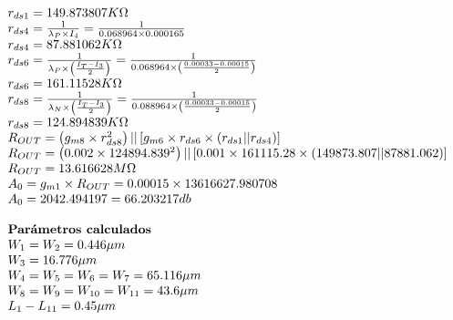 \begin{equation*}
\begin{array}{l l}
		r_{ds1} =  149.873807  K \Omega \\
		r_{ds4} = \frac{1}{\lambda_{P} \times I_{4}} = \frac{1}{ 0.068964  \times  0.000165 } \\
		r_{ds4} =  87.881062  K \Omega \\
		r_{ds6} = \frac{1}{\lambda_{P} \times \left( \frac{I_{T} - I_{3}}{2} \right)} = \frac{1}{ 0.068964  \times \left( \frac{ 0.00033  -  0.00015 }{2} \right)} \\
		r_{ds6} =  161.11528  K \Omega \\
		r_{ds8} = \frac{1}{\lambda_{N} \times \left( \frac{I_{T} - I_{3}}{2} \right)} = \frac{1}{ 0.088964  \times \left( \frac{ 0.00033  -  0.00015 }{2} \right)} \\
		r_{ds8} =  124.894839  K \Omega \\
		R_{OUT} = \left( g_{m8} \times r_{ds8}^{2} \right) || \left[ g_{m6} \times r_{ds6} \times \left( r_{ds1} || r_{ds4} \right) \right] \\
		R_{OUT} = \left(  0.002  \times  124894.839 ^{2} \right) || \left[  0.001  \times  161115.28  \times \left(  149873.807  ||  87881.062  \right) \right] \\
		R_{OUT} =  13.616628  M \Omega \\
		A_{0} = g_{m1} \times R_{OUT} =  0.00015  \times  13616627.980708  \\
		A_{0} =  2042.494197  =  66.203217  db \\
		\\
		\textbf{Parámetros calculados} \\
		W_{1} = W_{2} =  0.446  \mu m \\
		W_{3} =  16.776  \mu m \\
		W_{4} = W_{5} = W_{6} = W_{7} =  65.116  \mu m \\
		W_{8} = W_{9} = W_{10} = W_{11} =  43.6  \mu m \\
		L_{1} - L_{11} =  0.45  \mu m \\
	\end{array}
\end{equation*}